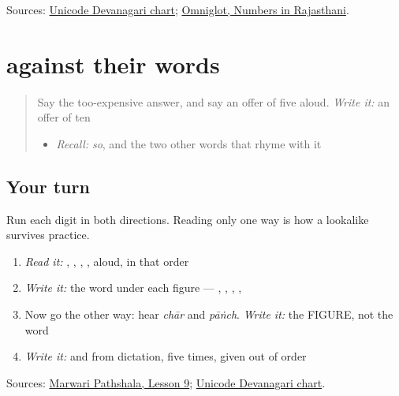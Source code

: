 \begin{tcolorbox}[breakable,colback=teal!4,colframe=teal!35!black,title={Before you move on}]
Sources: \href{https://www.unicode.org/charts/PDF/U0900.pdf}{Unicode Devanagari chart}; \href{https://www.omniglot.com/language/numbers/rajasthani.htm}{Omniglot, Numbers in Rajasthani}.
\end{tcolorbox}
\section[Practice]{   against their words}

\label{lesson:MW-C35-read-five-ticket}



\begin{quote}
Say the too-expensive answer, and say an offer of five aloud. \emph{Write it:} an offer of ten

\begin{itemize}
\raggedright
  \item \emph{Recall:} \emph{so}, and the two other words that rhyme with it
\end{itemize}
\end{quote}

\subsection*{Your turn}
Run each digit in both directions. Reading only one way is how a lookalike survives practice.

\begin{enumerate}
\raggedright
  \item \emph{Read it:} \textbf{}, \textbf{}, \textbf{}, \textbf{}, \textbf{} aloud, in that order
  \item \emph{Write it:} the word under each figure — \textbf{}, \textbf{}, \textbf{}, \textbf{}, \textbf{}
  \item Now go the other way: hear \emph{chār} and \emph{pāṅch}. \emph{Write it:} the FIGURE, not the word
  \item \emph{Write it:} \textbf{} and \textbf{} from dictation, five times, given out of order
\end{enumerate}

\begin{tcolorbox}[breakable,colback=teal!4,colframe=teal!35!black,title={Before you move on}]
Sources: \href{https://www.marwaripathshala.com/marwari-lesson-9-english}{Marwari Pathshala, Lesson 9}; \href{https://www.unicode.org/charts/PDF/U0900.pdf}{Unicode Devanagari chart}.
\end{tcolorbox}
